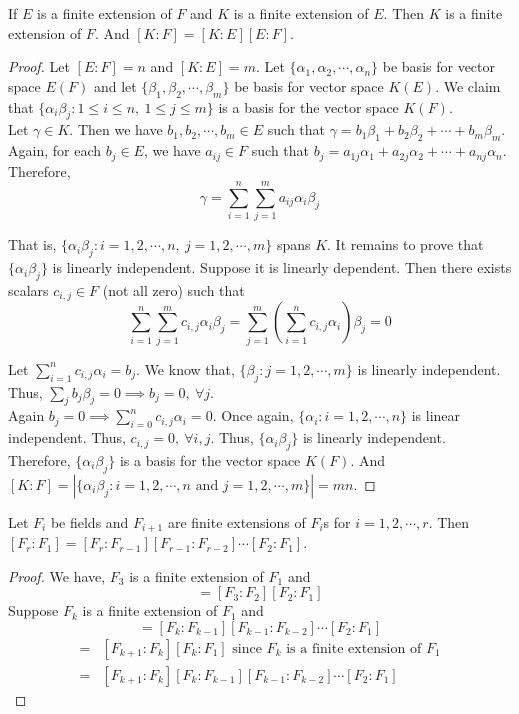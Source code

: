 \begin{theorem}
	If $E$ is a finite extension of $F$ and $K$ is a finite extension of $E$. Then $K$ is a finite extension of $F$. And $[K:F] = [K:E][E:F]$.
\end{theorem}
\begin{proof}
	Let $[E:F] = n$ and $[K:E] = m$. Let $\{ \alpha_1,\alpha_2,\cdots,\alpha_n \}$ be basis for vector space $E(F)$ and let $\{ \beta_1,\beta_2,\cdots,\beta_m\}$ be basis for vector space $K(E)$. We claim that $\{\alpha_i\beta_j : 1 \le i \le n,\ 1 \le j \le m \}$ is a basis for the vector space $K(F)$.\\

	Let $\gamma \in K$. Then we have $b_1,b_2,\cdots,b_m \in E$ such that $\gamma = b_1\beta_1+b_2\beta_2+\cdots+b_m\beta_m$. Again, for each $b_j \in E$, we have $a_{ij} \in F$ such that $b_j = a_{1j}\alpha_1+a_{2j}\alpha_2+\cdots+a_{nj}\alpha_n$. Therefore, 
	$$\gamma = \sum_{i=1}^n \sum_{j=1}^m a_{ij} \alpha_i \beta_j$$

	That is, $\{ \alpha_i \beta_j : i =1,2,\cdots,n,\ j=1,2,\cdots,m \}$ spans $K$. It remains to prove that $\{\alpha_i \beta_j \}$ is linearly independent. Suppose it is linearly dependent. Then there exists scalars $c_{i,j} \in F$ (not all zero) such that
	$$\sum_{i=1}^n \sum_{j=1}^m c_{i,j} \alpha_i \beta_j  = \sum_{j=1}^m \left( \sum_{i=1}^n c_{i,j} \alpha_i \right) \beta_j  = 0$$
	
	Let $\sum_{i=1}^n c_{i,j}\alpha_i = b_j$. We know that, $\{ \beta_j : j = 1,2,\cdots,m \}$ is linearly independent. Thus, $\sum_j b_j \beta_j = 0 \implies b_j = 0,\ \forall j$.\\
	
	Again $b_j = 0 \implies \sum_{i = 0}^n c_{i,j}\alpha_i = 0$. Once again, $\{ \alpha_i : i = 1,2,\cdots,n \}$ is linear independent. Thus, $c_{i,j} = 0,\ \forall i,j$. Thus, $\{ \alpha_i \beta_j \}$ is linearly independent. Therefore, $\{ \alpha_i \beta_j \}$ is a basis for the vector space $K(F)$. And $[K : F] = |\{\alpha_i \beta_j : i =1,2,\cdots,n \text{ and } j=1,2,\cdots,m\}|= mn$.
\end{proof}

\begin{corollary}
	Let $F_i$ be fields and $F_{i+1}$ are finite extensions of $F_i$s for $i = 1,2,\cdots,r$. Then $[F_r : F_1] = [F_r : F_{r-1}][F_{r-1}:F_{r-2}]\cdots[F_2:F_1]$.
\end{corollary}
\begin{proof}
	We have, $F_3$ is a finite extension of $F_1$ and 
	\begin{equation}
		[F_3:F_1] = [F_3:F_2][F_2:F_1]
	\end{equation}
	Suppose $F_k$ is a finite extension of $F_1$ and 
	\begin{equation}
		[F_k : F_1] = [F_k:F_{k-1}][F_{k-1}:F_{k-2}] \cdots [F_2:F_1]
	\end{equation}
	\begin{align*}
		[F_{k+1}:F_1] = & [F_{k+1} : F_k][F_k : F_1] \text{ since } F_k \text{ is a finite extension of } F_1\\
		= & [F_{k+1}:F_k][F_k:F_{k-1}][F_{k-1}:F_{k-2}] \cdots [F_2:F_1]
	\end{align*}
\end{proof}

